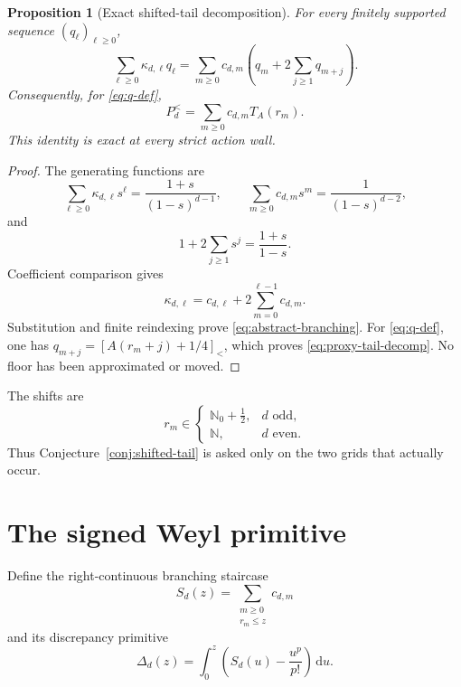 \documentclass[11pt]{article}
\newtheorem{proposition}[theorem]{Proposition}
\theoremstyle{remark}
\newcommand{\N}{\mathbb N}
\newcommand{\sbr}[1]{[#1]_{<}}
\newcommand{\dd}{\,\mathrm d}
\begin{document}
\begin{proposition}[Exact shifted-tail decomposition]
\label{prop:branching}
For every finitely supported sequence $(q_\ell)_{\ell\geq0}$,
\begin{equation}
 \sum_{\ell\geq0}\kappa_{d,\ell}q_\ell
 =\sum_{m\geq0}c_{d,m}
 \left(q_m+2\sum_{j\geq1}q_{m+j}\right).
 \label{eq:abstract-branching}
\end{equation}
Consequently, for \eqref{eq:q-def},
\begin{equation}
 \boxed{P_d^{<}=\sum_{m\geq0}c_{d,m}T_A(r_m).}
 \label{eq:proxy-tail-decomp}
\end{equation}
This identity is exact at every strict action wall.
\end{proposition}

\begin{proof}
The generating functions are
\[
 \sum_{\ell\geq0}\kappa_{d,\ell}s^\ell
 =\frac{1+s}{(1-s)^{d-1}},
 \qquad
 \sum_{m\geq0}c_{d,m}s^m=\frac1{(1-s)^{d-2}},
\]
and
\[
 1+2\sum_{j\geq1}s^j=\frac{1+s}{1-s}.
\]
Coefficient comparison gives
\[
 \kappa_{d,\ell}=c_{d,\ell}+2\sum_{m=0}^{\ell-1}c_{d,m}.
\]
Substitution and finite reindexing prove \eqref{eq:abstract-branching}.
For \eqref{eq:q-def}, one has
$q_{m+j}=\sbr{A(r_m+j)+1/4}$, which proves
\eqref{eq:proxy-tail-decomp}.  No floor has been approximated or moved.
\end{proof}

The shifts are
\[
 r_m\in
 \begin{cases}
 \N_0+\frac12,&d\text{ odd},\\
 \N,&d\text{ even}.
 \end{cases}
\]
Thus Conjecture~\ref{conj:shifted-tail} is asked only on the two grids that
actually occur.

\section{The signed Weyl primitive}
\label{sec:primitive}

Define the right-continuous branching staircase
\begin{equation}
 S_d(z)=\sum_{\substack{m\geq0\\r_m\leq z}}c_{d,m}
 \label{eq:S-def}
\end{equation}
and its discrepancy primitive
\begin{equation}
 \Delta_d(z)=\int_0^z
 \left(S_d(u)-\frac{u^p}{p!}\right)\dd u.
 \label{eq:Delta-def}
\end{equation}
\end{document}
